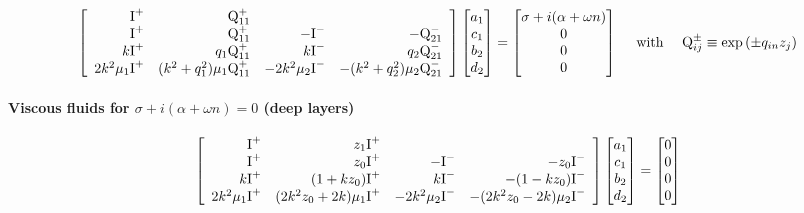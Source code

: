 \documentclass[prfluids]{revtex4-2}
\newcommand{\oneplus}{\text{I}^+}
\newcommand{\onemins}{\text{I}^-}
\newcommand{\Qplus}[1]{\text{Q}^{+}_{#1}}
\newcommand{\Qmins}[1]{\text{Q}^{-}_{#1}}
\begin{document}
\begin{footnotesize}\begin{eqnarray*}
  \left[\begin{array}{r r r r r r r r }
    \oneplus & \Qplus{11}
    \\
    \oneplus & \Qplus{11} & -\onemins & -\Qmins{21}
    \\
    k\oneplus & q_1\Qplus{11} & k\onemins &q_2\Qmins{21}
    \\
    2k^2\mu_1\oneplus & (k^2+q_1^2)\mu_1\Qplus{11} &
    -2k^2\mu_2\onemins  & -(k^2+q_2^2)\mu_2\Qmins{21}
  \end{array}\right]
  \left[\begin{matrix}
    a_1 \\ c_1 \\ b_2 \\ d_2
  \end{matrix}\right]
  =
  \left[\begin{matrix}
    \sigma + i(\alpha + \omega n) \\ 0 \\ 0 \\ 0
  \end{matrix}\right]
  \quad\text{ with }\quad \text{Q}^\pm_{ij} \equiv \exp{(\pm q_{in} z_j)}
\end{eqnarray*}\end{footnotesize}

\paragraph{Viscous fluids for $\sigma + i(\alpha + \omega n)=0$ (deep layers)}

\begin{footnotesize}\begin{eqnarray*}
  \left[\begin{array}{r r r r r r r r }
    \oneplus &   z_1\oneplus \\
    \oneplus &   z_0\oneplus & -\onemins & -z_0\onemins \\
    k\oneplus & (1+kz_0)\oneplus & k\onemins & -(1-kz_0)\onemins \\
     2k^2\mu_1 \oneplus & (2k^2z_0 + 2k)\mu_1 \oneplus & 
    -2k^2\mu_2 \onemins & -(2k^2z_0 - 2k) \mu_2\onemins \\
  \end{array}\right]
  \left[\begin{matrix}
    a_1 \\ c_1 \\ b_2 \\ d_2
  \end{matrix}\right]
  =
  \left[\begin{matrix}
    0 \\ 0 \\ 0 \\ 0
  \end{matrix}\right]
\end{eqnarray*}\end{footnotesize}
\end{document}
